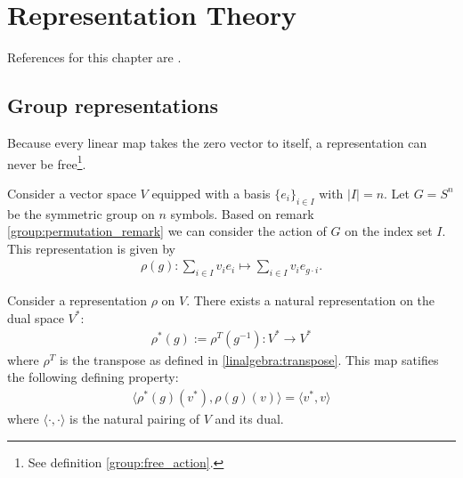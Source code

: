 \chapter{Representation Theory}

    References for this chapter are \cite{fultonharris, jeevanjee}.

\section{Group representations}


    \begin{property}
        Because every linear map takes the zero vector to itself, a representation can never be free\footnote{See definition \ref{group:free_action}.}.
    \end{property}


    \begin{example}
        Consider a vector space $V$ equipped with a basis $\{e_i\}_{i\in I}$ with $|I| = n$. Let $G = S^n$ be the symmetric group on $n$ symbols. Based on remark \ref{group:permutation_remark} we can consider the action of $G$ on the index set $I$. This representation is given by
        \begin{gather}
            \rho(g):\sum_{i\in I}v_ie_i\mapsto\sum_{i\in I}v_ie_{g\cdot i}.
        \end{gather}
    \end{example}

    \begin{example}
        Consider a representation $\rho$ on $V$. There exists a natural representation on the dual space $V^*$:
        \begin{gather}
            \rho^*(g) := \rho^T(g^{-1}): V^*\rightarrow V^*
        \end{gather}
        where $\rho^T$ is the transpose as defined in \ref{linalgebra:transpose}. This map satifies the following defining property:
        \begin{gather}
            \Big\langle\rho^*(g)(v^*), \rho(g)(v)\Big\rangle = \langle v^*, v\rangle
        \end{gather}
        where $\langle\cdot,\cdot\rangle$ is the natural pairing of $V$ and its dual.
    \end{example}

